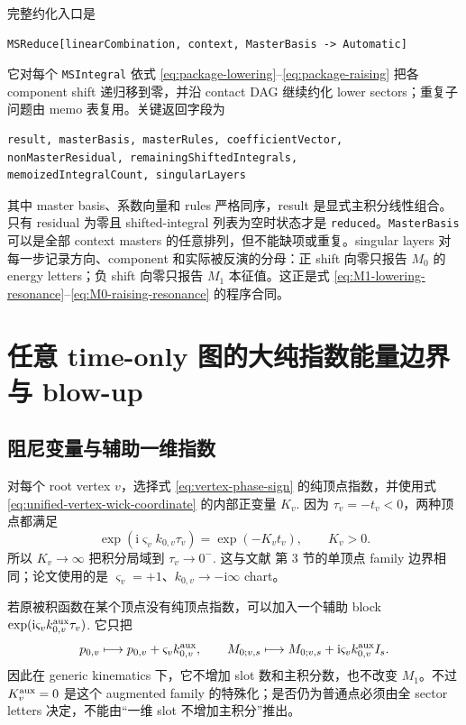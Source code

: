 \documentclass[11pt,a4paper]{ctexart}
\newcommand{\ii}{\mathrm i}
\begin{document}
完整约化入口是
\begin{verbatim}
MSReduce[linearCombination, context, MasterBasis -> Automatic]
\end{verbatim}
它对每个 \texttt{MSIntegral} 依式 \eqref{eq:package-lowering}--\eqref{eq:package-raising} 把各 component shift 递归移到零，并沿 contact DAG 继续约化 lower sectors；重复子问题由 memo 表复用。关键返回字段为
\begin{verbatim}
result, masterBasis, masterRules, coefficientVector,
nonMasterResidual, remainingShiftedIntegrals,
memoizedIntegralCount, singularLayers
\end{verbatim}
其中 master basis、系数向量和 rules 严格同序，result 是显式主积分线性组合。只有 residual 为零且 shifted-integral 列表为空时状态才是 \texttt{reduced}。\texttt{MasterBasis} 可以是全部 context masters 的任意排列，但不能缺项或重复。singular layers 对每一步记录方向、component 和实际被反演的分母：正 shift 向零只报告 $M_0$ 的 energy letters；负 shift 向零只报告 $M_1$ 本征值。这正是式 \eqref{eq:M1-lowering-resonance}--\eqref{eq:M0-raising-resonance} 的程序合同。

\section{任意 time-only 图的大纯指数能量边界与 blow-up}
\label{sec:boundary-blowup}

\subsection{阻尼变量与辅助一维指数}

对每个 root vertex $v$，选择式 \eqref{eq:vertex-phase-sign} 的纯顶点指数，并使用式 \eqref{eq:unified-vertex-wick-coordinate} 的内部正变量 $K_v$. 因为 $\tau_v=-t_v<0$，两种顶点都满足
\begin{equation}
 \exp(\ii\varsigma_vk_{0,v}\tau_v)=\exp(-K_vt_v),
 \qquad K_v>0.
 \label{eq:wick-damping-energy}
\end{equation}
所以 $K_v\to\infty$ 把积分局域到 $\tau_v\to0^-$. 这与文献 \cite{Chen:2024jms} 第 3 节的单顶点 family 边界相同；论文使用的是 $\varsigma_v=+1$、$k_{0,v}\to-\ii\infty$ chart。

若原被积函数在某个顶点没有纯顶点指数，可以加入一个辅助 block $\exp(\ii\varsigma_vk_{0,v}^{\rm aux}\tau_v)$. 它只把
\begin{equation}
 p_{0,v}\longmapsto p_{0,v}+\varsigma_vk_{0,v}^{\rm aux},
 \qquad
 M_{0;v,s}\longmapsto M_{0;v,s}
 +\ii\varsigma_vk_{0,v}^{\rm aux}I_s .
 \label{eq:auxiliary-energy-M0-shift}
\end{equation}
因此在 generic kinematics 下，它不增加 slot 数和主积分数，也不改变 $M_1$。不过 $K_v^{\rm aux}=0$ 是这个 augmented family 的特殊化；是否仍为普通点必须由全 sector letters 决定，不能由“一维 slot 不增加主积分”推出。
\end{document}
